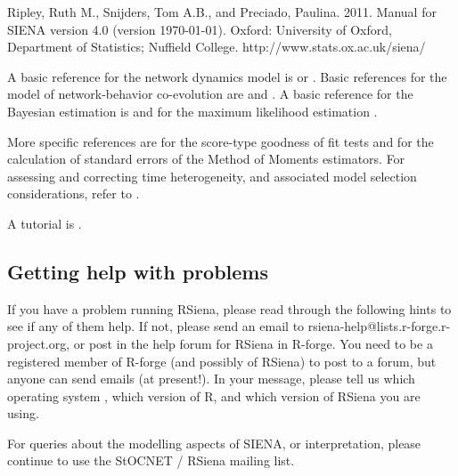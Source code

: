 \documentclass[a4paper,fleqn,11pt]{article}
\newcommand{\+}{\, + \,}
\newcommand{\Rn}{{\sf R}}
\newcommand{\rs}{{\sf RSiena}}
\newcommand{\RS}{{\sf RSiena }}
\newcommand{\SN}{{\sf StOCNET }}
\newcommand{\si}{{\sf SIENA}}
\begin{document}
{\noindent
Ripley, Ruth M., Snijders, Tom A.B., and Preciado, Paulina.
2011.
Manual for SIENA version 4.0 (version \today).
Oxford: University of Oxford, Department of Statistics; Nuffield College.
\textsf{http://www.stats.ox.ac.uk/siena/}

\smallskip

A basic reference for the network dynamics model is \citet{Snijders01}
or \citet{Snijders05}.
Basic references for the model of network-behavior co-evolution
are \citet*{SnijdersEA07} and \citet*{SteglichEA10}.
A basic reference for the Bayesian estimation is \citet{KoskinenSnijders07}
and for the maximum likelihood estimation \citet*{SnijdersEA10a}.

More specific references are \citet{Schweinberger12} for the score-type goodness
of fit tests and \citet{SchweinbergerSnijders07a} for the calculation of
standard errors of the Method of Moments estimators. For assessing and
correcting time heterogeneity, and associated model selection considerations,
refer to \citet*{Lospinoso2011}.

A tutorial is \citet*{SnijdersEA10b}.


\subsection{Getting help with problems}
\label{sec:problems}
If you have a problem running \rs, please read through the following hints to
see if any of them help. If not, please send an email to
rsiena-help@lists.r-forge.r-project.org, or post in the help forum for \RS in
R-forge. You need to be a registered member of R-forge (and possibly of \rs)
to post to a forum, but anyone can send emails (at present!). In your message,
please tell us which operating system , which version of \Rn, and which version
of \RS you are using.

For queries about the modelling aspects of \si, or interpretation, please
continue to use the \SN/ \RS mailing list.


}
\end{document}
